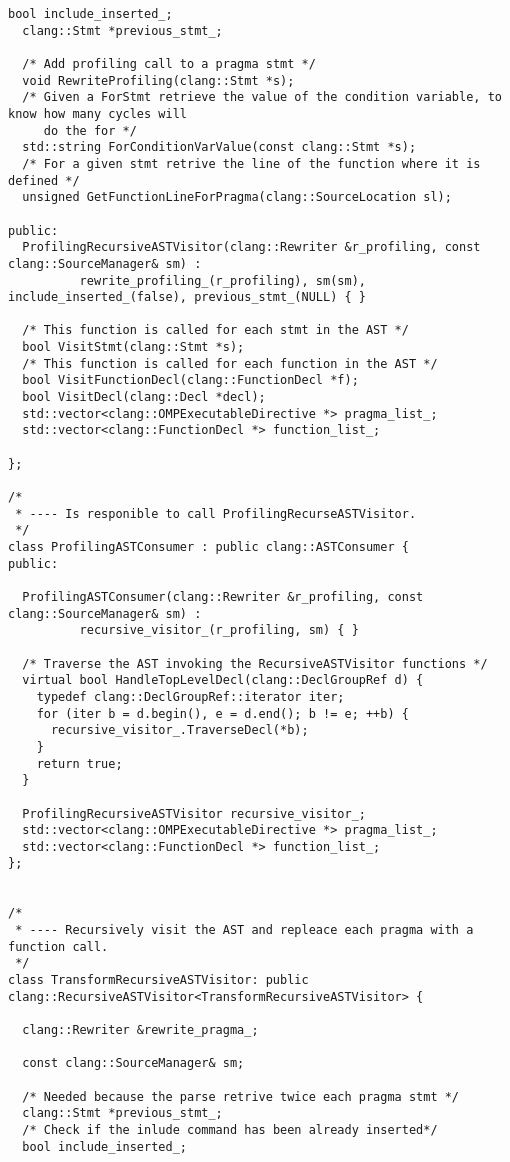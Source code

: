 \documentclass[a4paper,11pt,twoside]{book}
\begin{document}
\begin{lstlisting}[language=CCC, caption=driver/program.h]
  bool include_inserted_;
  clang::Stmt *previous_stmt_;

  /* Add profiling call to a pragma stmt */
  void RewriteProfiling(clang::Stmt *s);
  /* Given a ForStmt retrieve the value of the condition variable, to know how many cycles will
     do the for */
  std::string ForConditionVarValue(const clang::Stmt *s);
  /* For a given stmt retrive the line of the function where it is defined */
  unsigned GetFunctionLineForPragma(clang::SourceLocation sl);

public:
  ProfilingRecursiveASTVisitor(clang::Rewriter &r_profiling, const clang::SourceManager& sm) : 
          rewrite_profiling_(r_profiling), sm(sm), include_inserted_(false), previous_stmt_(NULL) { }
  
  /* This function is called for each stmt in the AST */
  bool VisitStmt(clang::Stmt *s);
  /* This function is called for each function in the AST */
  bool VisitFunctionDecl(clang::FunctionDecl *f);
  bool VisitDecl(clang::Decl *decl);
  std::vector<clang::OMPExecutableDirective *> pragma_list_;
  std::vector<clang::FunctionDecl *> function_list_;
    
};

/*
 * ---- Is responible to call ProfilingRecurseASTVisitor.
 */
class ProfilingASTConsumer : public clang::ASTConsumer { 
public:

  ProfilingASTConsumer(clang::Rewriter &r_profiling, const clang::SourceManager& sm) : 
          recursive_visitor_(r_profiling, sm) { }
  
  /* Traverse the AST invoking the RecursiveASTVisitor functions */
  virtual bool HandleTopLevelDecl(clang::DeclGroupRef d) {
    typedef clang::DeclGroupRef::iterator iter;
    for (iter b = d.begin(), e = d.end(); b != e; ++b) {
      recursive_visitor_.TraverseDecl(*b);
    } 
    return true; 
  }

  ProfilingRecursiveASTVisitor recursive_visitor_;
  std::vector<clang::OMPExecutableDirective *> pragma_list_;
  std::vector<clang::FunctionDecl *> function_list_;
};


/*
 * ---- Recursively visit the AST and repleace each pragma with a function call.
 */
class TransformRecursiveASTVisitor: public clang::RecursiveASTVisitor<TransformRecursiveASTVisitor> {

  clang::Rewriter &rewrite_pragma_;
  
  const clang::SourceManager& sm;

  /* Needed because the parse retrive twice each pragma stmt */
  clang::Stmt *previous_stmt_;
  /* Check if the inlude command has been already inserted*/
  bool include_inserted_;


\end{lstlisting}
\end{document}
